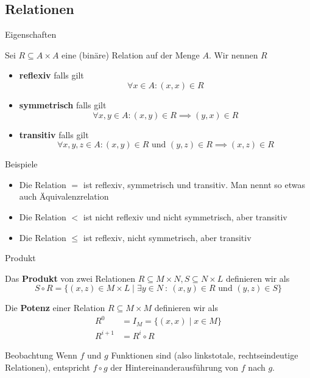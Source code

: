 \subsection{Relationen}
\begin{frame}{Eigenschaften}
	\begin{Definition}
		Sei $R \subseteq A \times A$ eine (binäre) Relation auf der Menge $A$. Wir nennen $R$
		\begin{itemize}[<+->]
			\item \textbf{reflexiv} falls gilt $$\forall x \in A: (x,x) \in R$$
			\item \textbf{symmetrisch} falls gilt $$\forall x,y \in A: (x,y) \in R \implies (y,x) \in R$$
			\item \textbf{transitiv} falls gilt $$\forall x,y,z \in A: (x,y) \in R \text{ und } (y,z) \in R \implies (x,z) \in R$$
		\end{itemize}
	\end{Definition}
\end{frame}

\begin{frame}{Beispiele}
	\begin{itemize}
		\item Die Relation $=$ ist \pause reflexiv, symmetrisch und transitiv. Man nennt so etwas auch Äquivalenzrelation
		\item \pause Die Relation $<$ ist \pause nicht reflexiv und nicht symmetrisch, aber transitiv
		\item \pause Die Relation $\leq$ ist \pause reflexiv, nicht symmetrisch, aber transitiv
	\end{itemize}
\end{frame}

\begin{frame}{Produkt}
	\begin{Definition}
		Das \textbf{Produkt} von zwei Relationen $R \subseteq M \times N, S \subseteq N \times L$ definieren wir als $$S \circ R = \{(x,z) \in M \times L \mid \exists y \in N \ : \ (x,y) \in R \text{ und } (y,z) \in S \}$$
	\end{Definition}	
	\pause
	
	\begin{Definition}
		Die \textbf{Potenz} einer Relation $R \subseteq M \times M$ definieren wir als
		\begin{align*}
			R^0 &= I_M = \{(x,x) \mid x \in M \} \\
			R^{i+1} &= R^i \circ R
		\end{align*}
	\end{Definition}

	\pause
	\begin{block}{Beobachtung}
		Wenn $f$ und $g$ Funktionen sind (also linkstotale, rechtseindeutige Relationen), entspricht $f \circ g$ der Hintereinanderausführung von $f$ nach $g$.
	\end{block}
\end{frame}

